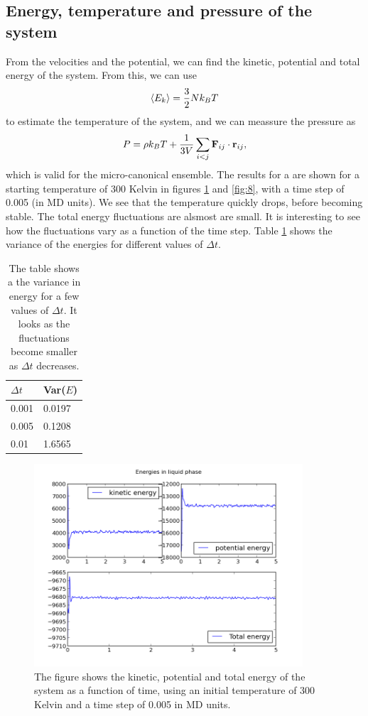 \documentclass[12pt]{article}
\def\rvec{\textbf{r}}
\def\Fvec{\textbf{F}}
\begin{document}
\subsection{Energy, temperature and pressure of the system}
From the velocities and the potential, we can find the kinetic, potential and total energy of the system. From this, we can use 
\begin{equation}
 \langle E_k \rangle = {3\over 2}Nk_B T 
\end{equation}
to estimate the temperature of the system, and we can meassure the pressure as 
\begin{equation}
 P = \rho k_B T + {1 \over 3V}\sum_{i<j} \Fvec_{ij} \cdot \rvec_{ij},
\end{equation}
which is valid for the micro-canonical ensemble. The results for a are shown for a starting temperature of 300 Kelvin in figures \ref{fig:7} and \ref{fig:8}, with a time step of 0.005 (in MD units). We see that the temperature quickly drops, before becoming stable. The total energy fluctuations are alsmost are small. It is interesting to see how the fluctuations vary as a function of the time step. Table \ref{tab:1} shows the variance of the energies for different values of $\Delta t$. 

\begin{table}
 \centering
 \begin{tabular}{|l|l|}
  \hline
  $\Delta t$ & Var($E$) \\
  \hline
  0.001 & 0.0197 \\ 
  0.005 & 0.1208 \\
  0.01 & 1.6565 \\
  \hline
 \end{tabular}
\caption{\label{tab:1} The table shows a the variance in energy for a few values of $\Delta t$. It looks as the fluctuations become smaller as $\Delta t$ decreases.}
\end{table}


  \begin{figure}
\centering
\includegraphics[width=10cm]{simpleenergies.png}
\caption{\label{fig:7} The figure shows the kinetic, potential and total energy of the system as a function of time, using an initial temperature of 300 Kelvin and a time step of 0.005 in MD units.}
\end{figure}
\end{document}
